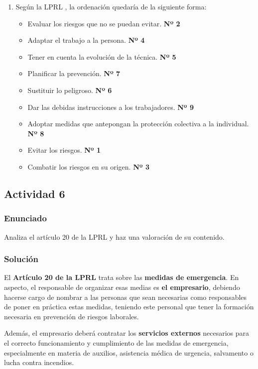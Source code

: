 \begin{enumerate}[label=\alph*.]
    \item Según la LPRL \cite{lprl01}, la ordenación quedaría de la siguiente forma:

        \begin{itemize}
        \item Evaluar los riesgos que no se puedan evitar.  \textbf{Nº 2}
        \item Adaptar el trabajo a la persona. \textbf{Nº 4}
        \item Tener en cuenta la evolución de la técnica. \textbf{Nº 5}
        \item Planificar la prevención. \textbf{Nº 7}
        \item Sustituir lo peligroso. \textbf{Nº 6}
        \item Dar las debidas instrucciones a los trabajadores. \textbf{Nº 9}
        \item Adoptar medidas que antepongan la protección colectiva a la individual. \textbf{Nº 8}
        \item Evitar los riesgos. \textbf{Nº 1}
        \item Combatir los riesgos en su origen. \textbf{Nº 3}
    \end{itemize}
\end{enumerate}

\subsection{Actividad 6}

\subsubsection{Enunciado}
Analiza el artículo 20 de la LPRL y haz una valoración de su contenido.

\subsubsection{Solución}
El \textbf{Artículo 20 de la LPRL} trata sobre las \textbf{medidas de emergencia}. En aspecto, el responsable de organizar esas medias es \textbf{el empresario}, debiendo hacerse cargo de nombrar a las personas que sean necesarias como responsables de poner en práctica estas medidas, teniendo este personal que tener la formación necesaria en prevención de riesgos laborales.

Además, el empresario deberá contratar los \textbf{servicios externos} necesarios para el correcto funcionamiento y cumplimiento de las medidas de emergencia, especialmente en materia de auxilios, asistencia médica de urgencia, salvamento o lucha contra incendios.

